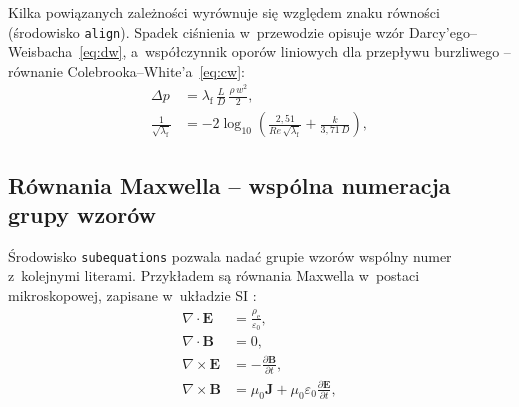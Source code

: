 Kilka powiązanych zależności wyrównuje się względem znaku równości
(środowisko \texttt{align}). Spadek ciśnienia w~przewodzie opisuje wzór
Darcy'ego--Weisbacha~\eqref{eq:dw}, a~współczynnik oporów liniowych dla
przepływu burzliwego -- równanie Colebrooka--White'a~\eqref{eq:cw}:
\begin{align}
  \Delta p &= \lambda_\mathrm{f}\,\frac{L}{D}\,\frac{\rho\,w^2}{2},
  \label{eq:dw}\\
  \frac{1}{\sqrt{\lambda_\mathrm{f}}} &= -2\log_{10}\left(
    \frac{2,51}{\mathit{Re}\,\sqrt{\lambda_\mathrm{f}}}
    + \frac{k}{3,71\,D}\right),
  \label{eq:cw}
\end{align}
\begin{gdzie}
\end{gdzie}

\subsection{Równania Maxwella -- wspólna numeracja grupy wzorów}
\label{sec:maxwell}

Środowisko \texttt{subequations} pozwala nadać grupie wzorów wspólny numer
z~kolejnymi literami. Przykładem są równania Maxwella w~postaci
mikroskopowej, zapisane w~układzie SI \cite{feynmanMaxwell}:
\begin{subequations}
  \label{eq:maxwell}
  \begin{align}
    \nabla\cdot\mathbf{E} &= \frac{\rho_\mathrm{e}}{\varepsilon_0},
    \label{eq:maxwell-gauss-e}\\
    \nabla\cdot\mathbf{B} &= 0,
    \label{eq:maxwell-gauss-b}\\
    \nabla\times\mathbf{E} &= -\frac{\partial\mathbf{B}}{\partial t},
    \label{eq:maxwell-faraday}\\
    \nabla\times\mathbf{B} &= \mu_0\mathbf{J}
      + \mu_0\varepsilon_0\frac{\partial\mathbf{E}}{\partial t},
    \label{eq:maxwell-ampere}
  \end{align}
\end{subequations}
\begin{gdzie}
\end{gdzie}

